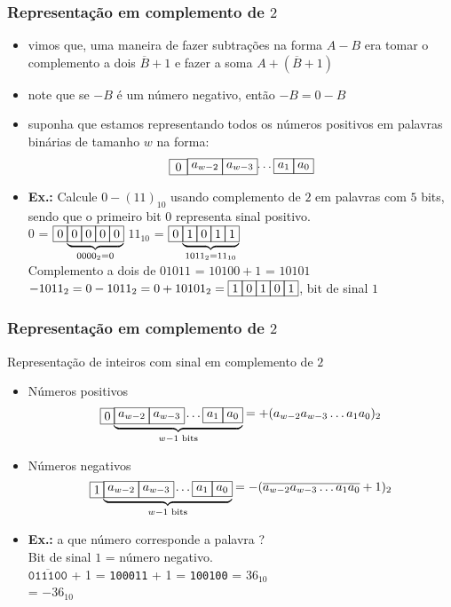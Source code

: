 \documentclass{beamer}
\newcommand{\WD}[1]{\fbox{#1}\hspace{-0.5pt}}
\begin{document}
\begin{frame}
\frametitle{Representação em complemento de $2$}

\begin{itemize}
\item vimos que, uma maneira de fazer subtrações na forma $A - B$ era tomar o complemento a dois $\overline{B} + 1$ e fazer a soma $A + (\overline{B} + 1)$
\item note que se $-B$ é um número negativo, então $-B = 0-B$
\item suponha que estamos representando todos os números positivos em palavras binárias de tamanho $w$ na forma:
$$
\WD{\,0\,}\raisebox{2.5pt}{\WD{$a_{w-2}$}\WD{$a_{w-3}$}\ldots\WD{$a_1$}\WD{$a_0$}}
$$
\pause
\item \textbf{Ex.:} Calcule $0 - (11)_{10}$ usando complemento de $2$ em palavras com $5$ bits, sendo que o primeiro bit $0$ representa sinal positivo.\\
\hspace{2cm}
$0$ = $\WD{0}\hspace{-1.5pt}\underbrace{\WD{0}\WD{0}\WD{0}\WD{0}}_{0000_2 = 0}$
\hspace{1cm}
$11_{10}$ = $\WD{0}\hspace{-1.5pt}\underbrace{\WD{1}\WD{0}\WD{1}\WD{1}}_{1011_2 = 11_{10}}$\\[6pt]\pause
Complemento a dois de $01011$ = $10100 + 1$ = $10101$\\[6pt]\pause
$-1011_2 = 0 - 1011_2 = 0 + 10101_2 = \WD{1}\WD{0}\WD{1}\WD{0}\WD{1}$, bit de sinal $1$
\end{itemize}

\end{frame}

\begin{frame}
\frametitle{Representação em complemento de $2$}

Representação de inteiros com sinal em complemento de $2$

\begin{itemize}
\item Números positivos
$$
    \raisebox{-2.5pt}{\WD{0}}\hspace{-1.8pt}\underbrace{\WD{$a_{w-2}$}\WD{$a_{w-3}$}\ldots\WD{$a_1$}\WD{$a_0$}}_{w-1\text{ bits}} = + (a_{w-2} a_{w-3} \ldots a_1 a_0)_2
$$
\item Números negativos
$$
    \raisebox{-2.5pt}{\WD{1}}\hspace{-1.8pt}\underbrace{\WD{$a_{w-2}$}\WD{$a_{w-3}$}\ldots\WD{$a_1$}\WD{$a_0$}}_{w-1\text{ bits}} = - (\overline{a_{w-2} a_{w-3} \ldots a_1 a_0} + 1)_2
$$
\item \textbf{Ex.:} a que número corresponde a palavra \WD{1}\WD{0}\WD{1}\WD{1}\WD{1}\WD{0}\WD{0} ?\\
\pause
Bit de sinal $1$ = número negativo.\\
\pause
$\overline{\texttt{011100}}$ + 1 = \texttt{100011} + 1 = \texttt{100100} = $36_{10}$\\
\pause
\WD{1}\WD{0}\WD{1}\WD{1}\WD{1}\WD{0}\WD{0} = $-36_{10}$
\end{itemize}

\end{frame}
\end{document}
